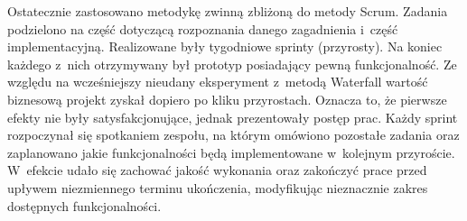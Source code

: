 Ostatecznie zastosowano metodykę zwinną zbliżoną do metody Scrum. Zadania podzielono na część dotyczącą rozpoznania danego zagadnienia i~część implementacyjną. Realizowane były tygodniowe sprinty (przyrosty). Na koniec każdego z~nich otrzymywany był prototyp posiadający pewną funkcjonalność. Ze względu na wcześniejszy nieudany eksperyment z~metodą Waterfall wartość biznesową projekt zyskał dopiero po kliku przyrostach. Oznacza to, że pierwsze efekty nie były satysfakcjonujące, jednak prezentowały postęp prac. Każdy sprint rozpoczynał się spotkaniem zespołu, na którym omówiono pozostałe zadania oraz zaplanowano jakie funkcjonalności będą implementowane w~kolejnym przyroście. W~efekcie udało się zachować jakość wykonania oraz zakończyć prace przed upływem niezmiennego terminu ukończenia, modyfikując nieznacznie zakres dostępnych funkcjonalności.